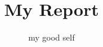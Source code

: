 \documentclass[11pt]{report}
\begin{document}
\title{My Report}
\author{my good self}
\date{}
\maketitle
\end{document}
